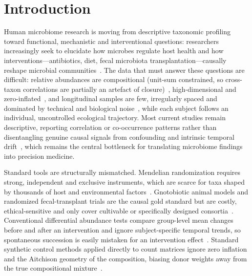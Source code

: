 \documentclass[11pt]{article}
\begin{document}
\section{Introduction}\label{sec:intro}

Human microbiome research is moving from descriptive taxonomic profiling toward functional, mechanistic and interventional questions: researchers increasingly seek to elucidate how microbes regulate host health and how interventions---antibiotics, diet, fecal microbiota transplantation---causally reshape microbial communities~\cite{wang2026integrating,khelfaoui2025beyond,khelfaoui2026strobe}. The data that must answer these questions are difficult: relative abundances are compositional (unit-sum constrained, so cross-taxon correlations are partially an artefact of closure)~\cite{gloor2017compositional}, high-dimensional and zero-inflated~\cite{ha2020compositional}, and longitudinal samples are few, irregularly spaced and dominated by technical and biological noise~\cite{lyu2023methodological,newman2023state}, while each subject follows an individual, uncontrolled ecological trajectory. Most current studies remain descriptive, reporting correlation or co-occurrence patterns rather than disentangling genuine causal signals from confounding and intrinsic temporal drift~\cite{ascandari2026association,jiang2026microbiome}, which remains the central bottleneck for translating microbiome findings into precision medicine.

Standard tools are structurally mismatched. Mendelian randomization requires strong, independent and exclusive instruments, which are scarce for taxa shaped by thousands of host and environmental factors~\cite{liu2022mendelian,taba2025novel}. Gnotobiotic animal models and randomized fecal-transplant trials are the causal gold standard but are costly, ethical-sensitive and only cover cultivable or specifically designed consortia~\cite{gu2025comparative,guggeis2025cross,wong2025assessment}. Conventional differential abundance tests compare group-level mean changes before and after an intervention and ignore subject-specific temporal trends, so spontaneous succession is easily mistaken for an intervention effect~\cite{li2025zinql,sankaran2024mbtransfer,lin2025temporal}. Standard synthetic control methods applied directly to count matrices ignore zero inflation and the Aitchison geometry of the composition, biasing donor weights away from the true compositional mixture~\cite{benmichael2022synthetic,chernozhukov2021exact,degliesposti2021can}.
\end{document}
